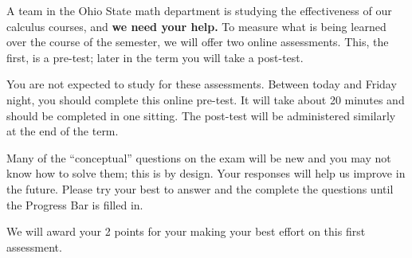 \documentclass{ximera}
\begin{document}
A team in the Ohio State math department is studying the effectiveness
of our calculus courses, and \textbf{we need your help.}  To measure
what is being learned over the course of the semester, we will offer
two online assessments.  This, the first, is a pre-test; later in the
term you will take a post-test.

You are not expected to study for these assessments.  Between today
and Friday night, you should complete this online pre-test.  It will
take about 20 minutes and should be completed in one sitting.  The
post-test will be administered similarly at the end of the term.

Many of the ``conceptual'' questions on the exam will be new and you
may not know how to solve them; this is by design.  Your responses
will help us improve in the future.  Please try your best to answer
and the complete the questions until the Progress Bar is filled in.

We will award your 2 points for your making your best effort on this
first assessment.
\end{document}
